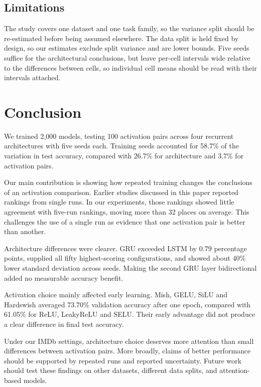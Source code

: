 \documentclass[conference,a4paper]{IEEEtran}
\begin{document}
\subsection{Limitations}

The study covers one dataset and one task family, so the variance
split should be re-estimated before being assumed elsewhere. The
data split is held fixed by design, so our estimates exclude split
variance and are lower bounds. Five seeds suffice for the
architectural conclusions, but leave per-cell intervals wide
relative to the differences between cells, so individual cell means
should be read with their intervals attached.

\section{Conclusion}

We trained 2{,}000 models, testing 100 activation pairs across
four recurrent architectures with five seeds each. Training
seeds accounted for 58.7\% of the variation in test accuracy,
compared with 26.7\% for architecture and 3.7\% for activation
pairs.

Our main contribution is showing how repeated training changes
the conclusions of an activation comparison. Earlier studies
discussed in this paper reported rankings from single runs.
In our experiments, those rankings showed little agreement
with five-run rankings, moving more than 32 places on average.
This challenges the use of a single run as evidence that one
activation pair is better than another.

Architecture differences were clearer. GRU exceeded LSTM by
0.79 percentage points, supplied all fifty highest-scoring
configurations, and showed about 40\% lower standard deviation
across seeds. Making the second GRU layer bidirectional added
no measurable accuracy benefit.

Activation choice mainly affected early learning. Mish, GELU,
SiLU and Hardswish averaged 73.70\% validation accuracy after
one epoch, compared with 61.05\% for ReLU, LeakyReLU and SELU.
Their early advantage did not produce a clear difference in
final test accuracy.

Under our IMDb settings, architecture choice deserves more
attention than small differences between activation pairs.
More broadly, claims of better performance should be supported
by repeated runs and reported uncertainty. Future work should
test these findings on other datasets, different data splits,
and attention-based models.
\end{document}
